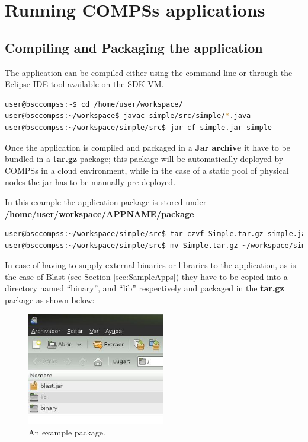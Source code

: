 \section{Running COMPSs applications}
\label{sec:RunningApps}

\subsection{Compiling and Packaging the application}
\label{subsec:compiling_and_packaging_apps}

The application can be compiled either using the command line or through the Eclipse IDE tool available on the SDK VM.

\begin{lstlisting}[language=bash]
user@bsccompss:~$ cd /home/user/workspace/
user@bsccompss:~/workspace$ javac simple/src/simple/*.java
user@bsccompss:~/workspace/simple/src$ jar cf simple.jar simple 
\end{lstlisting}


Once the application is compiled and packaged in a {\bf Jar archive} it have to be bundled in a {\bf tar.gz} package; this package will be automatically deployed by COMPSs in a cloud environment, while in the case of a static pool of physical nodes the jar has to be manually pre-deployed.

In this example the application package is stored under {\bf /home/user/workspace/APPNAME/package}

\begin{lstlisting}[language=bash]
user@bsccompss:~/workspace/simple/src$ tar czvf Simple.tar.gz simple.jar
user@bsccompss:~/workspace/simple/src$ mv Simple.tar.gz ~/workspace/simple/package/
\end{lstlisting}

In case of having to supply external binaries or libraries to the application, as is the case of Blast (see Section \ref{sec:SampleApps}) they have to be copied into a directory named “binary”, and “lib” respectively and packaged in the {\bf tar.gz} package as shown below:

\begin{figure}[h!]
  \centering
    \includegraphics[width=60mm]{./Sections/3_Running_Apps/Figures/example_package.jpeg}
    \caption{An example package. \label{fig:example_package}}
\end{figure}



